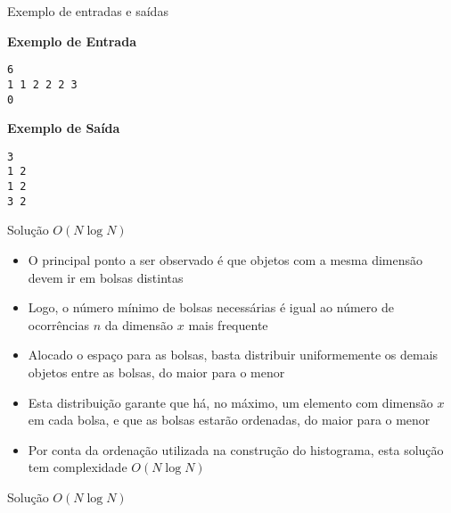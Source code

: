 \begin{frame}[fragile]{Exemplo de entradas e saídas}

\begin{minipage}[t]{0.5\textwidth}
\textbf{Exemplo de Entrada}
\begin{verbatim}
6
1 1 2 2 2 3
0
\end{verbatim}
\end{minipage}
\begin{minipage}[t]{0.45\textwidth}
\textbf{Exemplo de Saída}
\begin{verbatim}
3
1 2
1 2
3 2
\end{verbatim}
\end{minipage}
\end{frame}

\begin{frame}[fragile]{Solução $O(N\log N)$}

    \begin{itemize}
        \item O principal ponto a ser observado é que objetos com a mesma dimensão devem ir
            em bolsas distintas

        \item Logo, o número mínimo de bolsas necessárias é igual ao número de ocorrências $n$ da
            dimensão $x$ mais frequente

        \item Alocado o espaço para as bolsas, basta distribuir uniformemente os demais objetos 
            entre as bolsas, do maior para o menor

        \item Esta distribuição garante que há, no máximo, um elemento com dimensão $x$ em cada
            bolsa, e que as bolsas estarão ordenadas, do maior para o menor

        \item Por conta da ordenação utilizada na construção do histograma, esta solução tem 
            complexidade $O(N\log N)$
   \end{itemize}

\end{frame}

\begin{frame}[fragile]{Solução $O(N\log N)$}
\end{frame}
